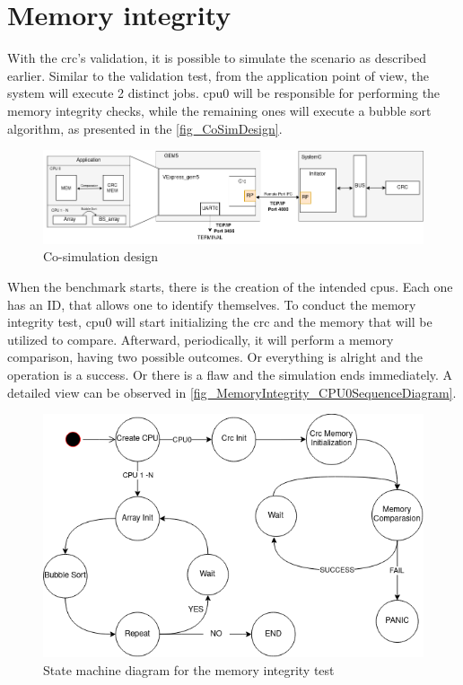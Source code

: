 \section{Memory integrity}

With the \gls*{crc}'s validation, it is possible to simulate the scenario as described earlier. Similar to the validation test, 
from the application point of view, the system will execute 2 distinct jobs. \gls{cpu}0 will be responsible for 
performing the memory integrity checks, while the remaining ones will execute a bubble sort algorithm, as presented in 
the \autoref{fig_CoSimDesign}.

\begin{figure}[H]
	\centering
 	\includegraphics[width=1\linewidth]{Images/CoSimDesign.png}
 	\caption{Co-simulation design}
	 \label{fig_CoSimDesign}
\end{figure}

When the benchmark starts, there is the creation of the intended \glspl{cpu}. Each one has an ID, that allows one to identify
themselves. To conduct the memory integrity test, \gls*{cpu}0 will start initializing the \gls*{crc} and the memory that will 
be utilized to compare. Afterward, periodically, it will perform a memory comparison, having two possible outcomes. Or everything
is alright and the operation is a success. Or there is a flaw and the simulation ends immediately. A detailed view can be 
observed in \ref{fig_MemoryIntegrity_CPU0SequenceDiagram}. 

\begin{figure}[H]
	\centering
 	\includegraphics[width=0.7\linewidth]{Images/MemoryIntegrity_StateDiagram.png}
 	\caption{State machine diagram for the memory integrity test}
	\label{fig_MemoryIntegrity_StateDiagram}
\end{figure}

